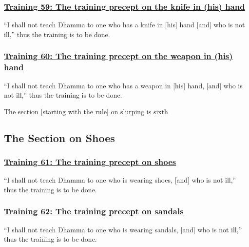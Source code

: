 \subsubsection*{\hyperref[sekh59]{Training 59: The training precept on the knife in (his) hand}}
\label{training59}
``I shall not teach Dhamma to one who has a knife in [his] hand [and] who is not ill,'' thus the training is to be done.



\subsubsection*{\hyperref[sekh60]{Training 60: The training precept on the weapon in (his) hand}}
\label{training60}
``I shall not teach Dhamma to one who has a weapon in [his] hand, [and] who is not ill,'' thus the training is to be done.

\begin{center}
	The section [starting with the rule] on slurping is sixth
\end{center}



\setsubsecheadstyle{\subsectionFmt}
\subsection{The Section on Shoes}
\label{trainings-vagga7}

\subsubsection*{\hyperref[sekh61]{Training 61: The training precept on shoes}}
\label{training61}
``I shall not teach Dhamma to one who is wearing shoes, [and] who is not ill,'' thus the training is to be done.



\subsubsection*{\hyperref[sekh62]{Training 62: The training precept on sandals}}
\label{training62}
``I shall not teach Dhamma to one who is wearing sandals, [and] who is not ill,'' thus the training is to be done.



